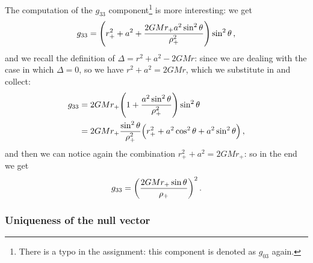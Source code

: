 \documentclass[main.tex]{subfiles}
\begin{document}
The computation of the \(g_{33} \) component\footnote{There is a typo in the assignment: this component is denoted as \(g_{03}\) again.} is more interesting: we get 
%
\begin{align}
  g_{33} = \qty( r_+^2 + a^2 + \frac{2GMr_{+} a^2 \sin^2\theta }{\rho_{+}^2}) \sin^2 \theta 
\,,
\end{align}
%
and we recall the definition of \(\Delta = r^2 + a^2 - 2GM r\): since we are dealing with the case in which \(\Delta = 0\), so we have \(r^2 + a^2 = 2GMr\), which we substitute in and collect:
%
\begin{subequations}
\begin{align}
  g_{33} &= 2GMr_{+} \qty(1 + \frac{a^2 \sin^2\theta }{\rho_{+}^2}) \sin^2\theta \\
  &= 2GMr_{+} \frac{\sin^2 \theta }{\rho_{+}^2} \qty(r_{+}^2 + a^2 \cos^2 \theta + a^2 \sin^2\theta )
\,,
\end{align}
\end{subequations}
%
and then we can notice again the combination \(r_{+}^2 + a^2 = 2GMr_{+}\): so in the end we get 
%
\begin{align}
  g_{33} = \qty(\frac{2GMr_{+} \sin \theta }{\rho_{+}})^2
\,.
\end{align}

\subsubsection{Uniqueness of the null vector}
\end{document}

